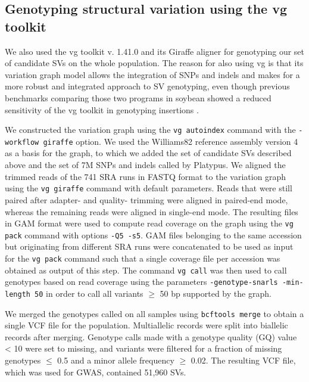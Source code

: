 \subsection*{Genotyping structural variation using the vg toolkit}
\label{sv-gwas-sv-genotyping-vg}

We also used the vg toolkit v. 1.41.0 \citep{hickey2020} and its Giraffe
aligner \citep{siren2021} for genotyping our set of candidate SVs on the whole
population. The reason for also using vg is that its variation graph model allows
the integration of SNPs and indels and makes for a more robust and integrated
approach to SV genotyping, even though previous benchmarks comparing those two
programs in soybean showed a reduced sensitivity of the vg toolkit in
genotyping insertions \citep{lemay2022}.

We constructed the variation graph using the \texttt{vg autoindex} command with
the \texttt{-\-workflow giraffe} option. We used the Williams82 reference
assembly version 4 as a basis for the graph, to which we added the set of
candidate SVs described above and the set of 7M SNPs and indels called by
Platypus.  We aligned the trimmed reads of the 741 SRA runs in FASTQ format to
the variation graph using the \texttt{vg giraffe} command with default
parameters. Reads that were still paired after adapter- and quality- trimming
were aligned in paired-end mode, whereas the remaining reads were aligned in
single-end mode. The resulting files in GAM format were used to compute read
coverage on the graph using the \texttt{vg pack} command with options
\texttt{-Q5 -s5}. GAM files belonging to the same accession but originating
from different SRA runs were concatenated to be used as input for the
\texttt{vg pack} command such that a single coverage file per accession was
obtained as output of this step. The command \texttt{vg call} was then used to
call genotypes based on read coverage using the parameters
\texttt{-\-genotype-snarls -\-min-length 50} in order to call all variants
$\geq$ 50 bp supported by the graph.

We merged the genotypes called on all samples using \texttt{bcftools merge} to
obtain a single VCF file for the population. Multiallelic records were split
into biallelic records after merging. Genotype calls made with a genotype
quality (GQ) value < 10 were set to missing, and variants were filtered for a
fraction of missing genotypes $\leq$ 0.5 and a minor allele frequency $\geq$
0.02. The resulting VCF file, which was used for GWAS, contained 51,960 SVs.

